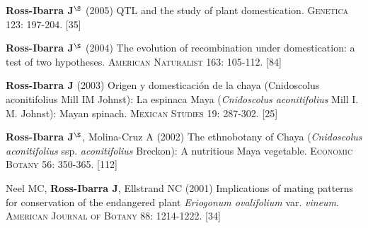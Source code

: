\documentclass[letterpaper,10pt]{article}
\renewenvironment{itemize}{
  \begin{list}{}{
    \setlength{\leftmargin}{1.5em}
  }
}{
  \end{list}
}
\begin{document}
\begin{etaremune}
\item {\bf Ross-Ibarra J}$^\S$ (2005) QTL and the study of plant domestication.  \textsc{Genetica} 123: 197-204.
 [35]\\


\item {\bf Ross-Ibarra J}$^\S$ (2004) The evolution of recombination under domestication: a test of two hypotheses.  \textsc{American Naturalist} 163: 105-112.
 [84]\\


\item {\bf Ross-Ibarra J} (2003) Origen y domesticaci\'on de la chaya (Cnidoscolus aconitifolius Mill IM Johnst): La espinaca Maya (\emph{Cnidoscolus aconitifolius} Mill I. M. Johnst): Mayan spinach.  \textsc{Mexican Studies} 19: 287-302.
 [25]\\

\item {\bf Ross-Ibarra J}$^\S$, Molina-Cruz A (2002) The ethnobotany of Chaya (\emph{Cnidoscolus aconitifolius} ssp. \emph{aconitifolius} Breckon): A nutritious Maya vegetable. \textsc{Economic Botany} 56: 350-365.
 [112]\\

\item  Neel MC, {\bf Ross-Ibarra J}, Ellstrand NC (2001) Implications of mating patterns for conservation of the endangered plant \emph{Eriogonum ovalifolium} var. \emph{vineum}.  \textsc{American Journal of Botany} 88: 1214-1222.
 [34]\\
\end{etaremune}


\end{document}
